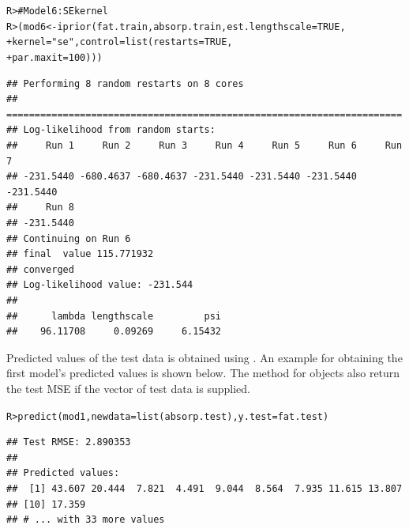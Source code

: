 \documentclass[showframe,11pt,twoside,openright]{report}\usepackage[]{graphicx}\usepackage{xcolor}
\makeatletter
\newcommand{\hlnum}[1]{\textcolor[rgb]{0.063,0.58,0.627}{#1}}%
\newcommand{\hlstr}[1]{\textcolor[rgb]{0.063,0.58,0.627}{#1}}%
\newcommand{\hlcom}[1]{\textcolor[rgb]{0.588,0.588,0.588}{#1}}%
\newcommand{\hlstd}[1]{\textcolor[rgb]{0.196,0.196,0.196}{#1}}%
\newcommand{\hlkwb}[1]{\textcolor[rgb]{0.627,0,0.314}{#1}}%
\newcommand{\hlkwc}[1]{\textcolor[rgb]{0,0.631,0.314}{#1}}%
\newcommand{\hlkwd}[1]{\textcolor[rgb]{0.78,0.227,0.412}{#1}}%
\newenvironment{kframe}{%
 \def\at@end@of@kframe{}%
 \ifinner\ifhmode%
  \def\at@end@of@kframe{\end{minipage}}%
  \begin{minipage}{\columnwidth}%
 \fi\fi%
 \def\FrameCommand##1{\hskip\@totalleftmargin \hskip-\fboxsep
 \colorbox{shadecolor}{##1}\hskip-\fboxsep
     \hskip-\linewidth \hskip-\@totalleftmargin \hskip\columnwidth}%
 \MakeFramed {\advance\hsize-\width
   \@totalleftmargin\z@ \linewidth\hsize
   \@setminipage}}%
 {\par\unskip\endMakeFramed%
 \at@end@of@kframe}
\newenvironment{knitrout}{}{} %
\makeatother
\begin{document}
\begin{knitrout}
\color{fgcolor}\begin{kframe}
\singlespacing\begin{alltt}
\hlstd{R> }\hlcom{# Model 6: SE kernel}
\hlstd{R> }\hlstd{(mod6} \hlkwb{<-} \hlkwd{iprior}\hlstd{(fat.train, absorp.train,} \hlkwc{est.lengthscale} \hlstd{=} \hlnum{TRUE}\hlstd{,}
\hlstd{+  }                \hlkwc{kernel} \hlstd{=} \hlstr{"se"}\hlstd{,} \hlkwc{control} \hlstd{=} \hlkwd{list}\hlstd{(}\hlkwc{restarts} \hlstd{=} \hlnum{TRUE}\hlstd{,}
\hlstd{+  }                                              \hlkwc{par.maxit} \hlstd{=} \hlnum{100}\hlstd{)))}
\end{alltt}
\begin{verbatim}
## Performing 8 random restarts on 8 cores
## ======================================================================
## Log-likelihood from random starts:
##     Run 1     Run 2     Run 3     Run 4     Run 5     Run 6     Run 7 
## -231.5440 -680.4637 -680.4637 -231.5440 -231.5440 -231.5440 -231.5440 
##     Run 8 
## -231.5440 
## Continuing on Run 6 
## final  value 115.771932 
## converged
## Log-likelihood value: -231.544 
## 
##      lambda lengthscale         psi 
##    96.11708     0.09269     6.15432
\end{verbatim}
\end{kframe}
\end{knitrout}



Predicted values of the test data is obtained using .
An example for obtaining the first model's predicted values is shown below.
The  method for  objects also return the test MSE if the vector of test data is supplied.

\begin{knitrout}
\color{fgcolor}\begin{kframe}
\singlespacing\begin{alltt}
\hlstd{R> }\hlkwd{predict}\hlstd{(mod1,} \hlkwc{newdata} \hlstd{=} \hlkwd{list}\hlstd{(absorp.test),} \hlkwc{y.test} \hlstd{= fat.test)}
\end{alltt}
\begin{verbatim}
## Test RMSE: 2.890353 
## 
## Predicted values:
##  [1] 43.607 20.444  7.821  4.491  9.044  8.564  7.935 11.615 13.807
## [10] 17.359
## # ... with 33 more values
\end{verbatim}
\end{kframe}
\end{knitrout}
\end{document}
